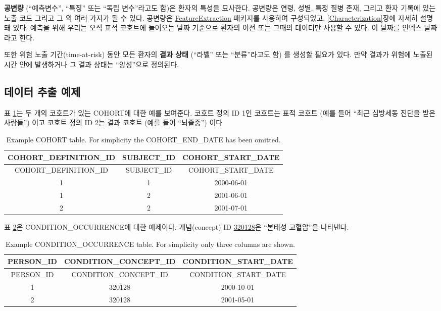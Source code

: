 \documentclass[11pt]{book}
\theoremstyle{definition}
\theoremstyle{definition}
\theoremstyle{definition}
\theoremstyle{remark}
\begin{document}
\textbf{공변량} (``예측변수'', ``특징'' 또는 ``독립 변수''라고도 함)은
환자의 특성을 묘사한다. 공변량은 연령, 성별, 특정 질병 존재, 그리고 환자
기록에 있는 노출 코드 그리고 그 외 여러 가지가 될 수 있다. 공변량은
\href{https://ohdsi.github.io/FeatureExtraction/}{FeatureExtraction}
패키지를 사용하여 구성되었고, \ref{Characterization}장에 자세히 설명돼
있다. 예측을 위해 우리는 오직 표적 코호트에 들어오는 날짜 기준으로
환자의 이전 또는 그때의 데이터만 사용할 수 있다. 이 날짜를 인덱스
날짜라고 한다.

또한 위험 노출 기간(time-at-risk) 동안 모든 환자의 \textbf{결과 상태}
(``라벨'' 또는 ``분류''라고도 함) 를 생성할 필요가 있다. 만약 결과가
위험에 노출된 시간 안에 발생하거나 그 결과 상태는 ``양성''으로
정의된다.  

\subsection{데이터 추출 예제}\label{--}

표 \ref{tab:plpExampleCohorts}는 두 개의 코호트가 있는 COHORT에 대한
예를 보여준다. 코호트 정의 ID 1인 코호트는 표적 코호트 (예를 들어 ``최근
심방세동 진단을 받은 사람들'') 이고 코호트 정의 ID 2는 결과 코호트 (예를
들어 ``뇌졸중'') 이다

\begin{longtable}[]{@{}ccc@{}}
\caption{\label{tab:plpExampleCohorts} Example COHORT table. For simplicity
the COHORT\_END\_DATE has been omitted.}\tabularnewline
\toprule
COHORT\_DEFINITION\_ID & SUBJECT\_ID &
COHORT\_START\_DATE\tabularnewline
\midrule
\endfirsthead
\toprule
COHORT\_DEFINITION\_ID & SUBJECT\_ID &
COHORT\_START\_DATE\tabularnewline
\midrule
\endhead
1 & 1 & 2000-06-01\tabularnewline
1 & 2 & 2001-06-01\tabularnewline
2 & 2 & 2001-07-01\tabularnewline
\bottomrule
\end{longtable}

표 \ref{tab:plpExampleConditions}은 CONDITION\_OCCURRENCE에 대한
예제이다. 개념(concept) ID
\href{http://athena.ohdsi.org/search-terms/terms/320128}{320128}은
``본태성 고혈압''을 나타낸다.

\begin{longtable}[]{@{}ccc@{}}
\caption{\label{tab:plpExampleConditions} Example CONDITION\_OCCURRENCE
table. For simplicity only three columns are shown.}\tabularnewline
\toprule
PERSON\_ID & CONDITION\_CONCEPT\_ID &
CONDITION\_START\_DATE\tabularnewline
\midrule
\endfirsthead
\toprule
PERSON\_ID & CONDITION\_CONCEPT\_ID &
CONDITION\_START\_DATE\tabularnewline
\midrule
\endhead
1 & 320128 & 2000-10-01\tabularnewline
2 & 320128 & 2001-05-01\tabularnewline
\bottomrule
\end{longtable}
\end{document}
